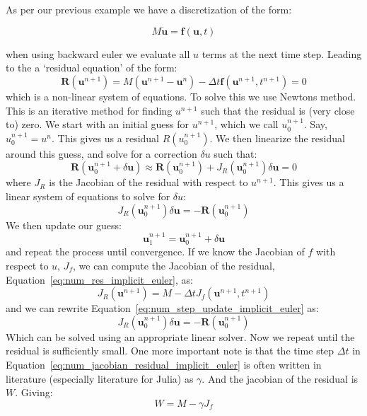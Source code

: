 As per our previous example we have a discretization of the form:

\begin{equation}\label{eq:num_linear-implicit-newton_Mdotu}
    M\dot {\mathbf{u}} = \mathbf{f}(\mathbf{u},t)
\end{equation}

when using backward euler we evaluate all $u$ terms at the next time step. Leading to the a `residual equation' of the form:
\begin{equation}\label{eq:num_res_implicit_euler}
    \mathbf{R}(\mathbf{u}^{n+1}) = M(\mathbf{u}^{n+1} - \mathbf{u}^{n}) - \Delta t \mathbf{f}(\mathbf{u}^{n+1},t^{n+1}) = 0
\end{equation}
which is a non-linear system of equations. To solve this we use Newtons method. This is an iterative method for finding $u^{n+1}$ such that the residual is (very close to) zero. We start with an initial guess for $u^{n+1}$, which we call $u^{n+1}_0$. Say, $u^{n+1}_0 = u^n$.  This gives us a residual $R(u^{n+1}_0)$. We then linearize the residual around this guess, and solve for a correction $\delta u$ such that:
\begin{equation}
    \mathbf{R}(\mathbf{u}^{n+1}_0 + \delta \mathbf{u}) \approx \mathbf{R}(\mathbf{u}^{n+1}_0) + J_R(\mathbf{u}^{n+1}_0) \delta \mathbf{u} = 0
\end{equation}
where $J_R$ is the Jacobian of the residual with respect to $u^{n+1}$. This gives us a linear system of equations to solve for $\delta u$:
\begin{equation}
    J_R(\mathbf{u}^{n+1}_0) \delta \mathbf{u} = -\mathbf{R}(\mathbf{u}^{n+1}_0)
\end{equation}
We then update our guess:
\begin{equation}\label{eq:num_step_update_implicit_euler}
    \mathbf{u}^{n+1}_1 = \mathbf{u}^{n+1}_0 + \delta \mathbf{u}
\end{equation}
and repeat the process until convergence. If we know the Jacobian of $f$ with respect to $u$, $J_f$, we can compute the Jacobian of the residual, Equation~\ref{eq:num_res_implicit_euler}, as:
\begin{equation}\label{eq:num_jacobian_residual_implicit_euler}
    J_R(\mathbf{u}^{n+1}) = M - \Delta t J_f(\mathbf{u}^{n+1},t^{n+1})
\end{equation}
and we can rewrite Equation~\ref{eq:num_step_update_implicit_euler} as:
\begin{equation}
    J_R(\mathbf{u}^{n+1}_0)\delta \mathbf{u} = - \mathbf{R}(\mathbf{u}^{n+1}_0)
\end{equation}
Which can be solved using an appropriate linear solver. Now we repeat until the residual is sufficiently small. One more important note is that the time step $\Delta t$ in Equation~\ref{eq:num_jacobian_residual_implicit_euler} is often written in literature (especially literature for Julia) as $\gamma$. And the jacobian of the residual is $W$. Giving:
\begin{equation}\label{eq:num_jacobian_residual_implicit_euler_gamma}
    W = M-\gamma J_f
\end{equation}

